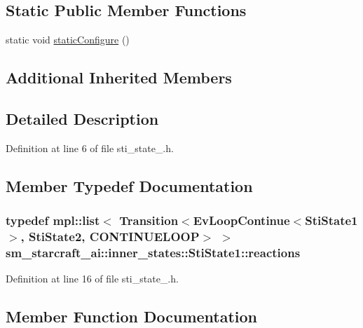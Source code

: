 \subsection*{Static Public Member Functions}
\begin{DoxyCompactItemize}
\item 
static void \hyperlink{structsm__starcraft__ai_1_1inner__states_1_1StiState1_a80e77b540fa32b7c30dc9591a42647c7}{static\+Configure} ()
\end{DoxyCompactItemize}
\subsection*{Additional Inherited Members}


\subsection{Detailed Description}


Definition at line 6 of file sti\+\_\+state\+\_.\+h.



\subsection{Member Typedef Documentation}
\subsubsection[{\texorpdfstring{reactions}{reactions}}]{\setlength{\rightskip}{0pt plus 5cm}typedef mpl\+::list$<$ Transition$<$Ev\+Loop\+Continue$<${\bf Sti\+State1}$>$, {\bf Sti\+State2}, C\+O\+N\+T\+I\+N\+U\+E\+L\+O\+OP$>$ $>$ {\bf sm\+\_\+starcraft\+\_\+ai\+::inner\+\_\+states\+::\+Sti\+State1\+::reactions}}\hypertarget{structsm__starcraft__ai_1_1inner__states_1_1StiState1_a071cce734a1425d1229795a21e0500a4}{}\label{structsm__starcraft__ai_1_1inner__states_1_1StiState1_a071cce734a1425d1229795a21e0500a4}


Definition at line 16 of file sti\+\_\+state\+\_.\+h.



\subsection{Member Function Documentation}
